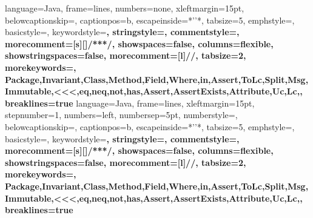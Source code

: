  {
  language=Java,
  frame=lines,
  numbers=none,
  xleftmargin=15pt, 
  belowcaptionskip=\bigskipamount,
  captionpos=b, 
  escapeinside={*'}{'*},
  tabsize=5,
  emphstyle={\bf},
  basicstyle=\scriptsize\ttfamily,
  keywordstyle=\color{javapurple}\bfseries,
  stringstyle=\color{javared},
  commentstyle=\color{javagreen},
  morecomment=[s][\color{javadocblue}]{/**}{*/},
  showspaces=false,
  columns=flexible,
  showstringspaces=false,
  morecomment=[l]{//},
  tabsize=2,
  morekeywords={, Package,Invariant,Class,Method,Field,Where,in,Assert,ToLc,Split,Msg,Immutable,<<<,eq,neq,not,has,Assert,AssertExists,Attribute,Uc,Lc,},
  breaklines=true
}
 {
  language=Java,
  frame=lines,
  xleftmargin=15pt, 
  stepnumber=1, 
  numbers=left, 
  numbersep=5pt,
  numberstyle=\tiny\color[gray]{0.3}, 
  belowcaptionskip=\bigskipamount,
  captionpos=b, 
  escapeinside={*'}{'*},
  tabsize=5,
  emphstyle={\bf},
  basicstyle=\scriptsize\ttfamily,
  keywordstyle=\color{black}\bfseries,
  stringstyle=\color{black},
  commentstyle=\color{black},
  morecomment=[s][\color{black}]{/**}{*/},
  showspaces=false,
  columns=flexible,
  showstringspaces=false,
  morecomment=[l]{//},
  tabsize=2,
  morekeywords={, Package,Invariant,Class,Method,Field,Where,in,Assert,ToLc,Split,Msg,Immutable,<<<,eq,neq,not,has,Assert,AssertExists,Attribute,Uc,Lc,},
  breaklines=true
}
\lstset{style=MyJavaStyle}

\makeatletter
\def\url@smallleostyle{%
  \@ifundefined{selectfont}{\def\UrlFont{\sf}}{\def\UrlFont{\footnotesize\rmfamily\mdseries}}}
\makeatother

\makeatletter
\def\url@leostyle{%
  \@ifundefined{selectfont}{\def\UrlFont{\sf}}{\def\UrlFont{\scriptsize\rmfamily\mdseries}}}
\makeatother

